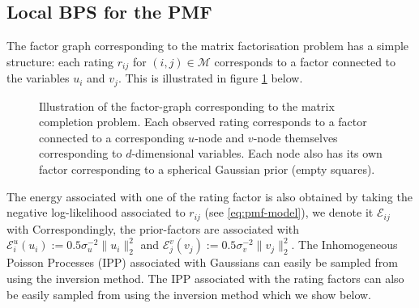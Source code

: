 \subsection{Local BPS for the PMF}

The factor graph corresponding to the matrix factorisation problem has a simple structure: each rating $r_{ij}$ for $(i,j)\in\mathcal M$ corresponds to a factor connected to the variables $u_{i}$ and $v_{j}$. This is illustrated in figure \ref{fig:pmf-graph} below.

\begin{figure}[!h]
\center
{}
\caption{\label{fig:pmf-graph} Illustration of the factor-graph corresponding to the matrix completion problem. Each observed rating corresponds to a factor connected to a corresponding $u$-node and $v$-node themselves corresponding to $d$-dimensional variables. Each node also has its own factor corresponding to a spherical Gaussian prior (empty squares).}
\end{figure} 


The energy associated with one of the rating factor is also obtained by taking the negative log-likelihood associated to $r_{ij}$ (see \eqref{eq:pmf-model}), we denote it $\mathcal E_{ij}$ with
%
%
Correspondingly, the prior-factors are associated with $\mathcal E^{u}_{i}(u_{i}):=0.5\sigma_{u}^{-2}\|u_{i}\|_{2}^{2}$ and $\mathcal E^{v}_{j}(v_{j}):=0.5\sigma_{v}^{-2}\|v_{j}\|_{2}^{2}$. The Inhomogeneous Poisson Processes (IPP) associated with Gaussians can easily be sampled from using the inversion method. 
The IPP associated with the rating factors can also be easily sampled from using the inversion method which we show below.

